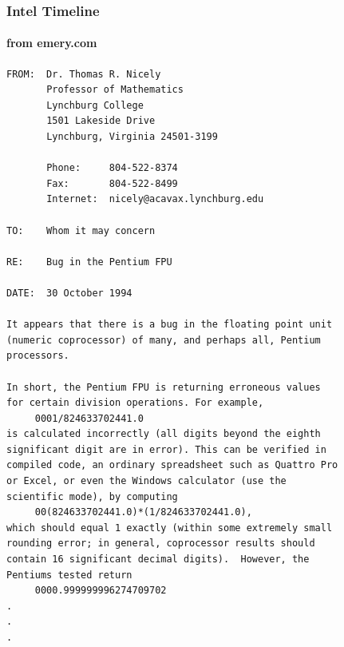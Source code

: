 \documentclass[10pt]{beamer}
\begin{document}
\begin{frame}
\frametitle{Intel Timeline}
\framesubtitle{from emery.com}
\begin{center}
    
\begin{block}{}
\begin{verbatim}
FROM:  Dr. Thomas R. Nicely
       Professor of Mathematics
       Lynchburg College
       1501 Lakeside Drive
       Lynchburg, Virginia 24501-3199

       Phone:     804-522-8374
       Fax:       804-522-8499
       Internet:  nicely@acavax.lynchburg.edu

TO:    Whom it may concern

RE:    Bug in the Pentium FPU

DATE:  30 October 1994

It appears that there is a bug in the floating point unit
(numeric coprocessor) of many, and perhaps all, Pentium
processors.

In short, the Pentium FPU is returning erroneous values 
for certain division operations. For example,
     0001/824633702441.0
is calculated incorrectly (all digits beyond the eighth
significant digit are in error). This can be verified in
compiled code, an ordinary spreadsheet such as Quattro Pro
or Excel, or even the Windows calculator (use the
scientific mode), by computing
     00(824633702441.0)*(1/824633702441.0),
which should equal 1 exactly (within some extremely small
rounding error; in general, coprocessor results should 
contain 16 significant decimal digits).  However, the
Pentiums tested return
     0000.999999996274709702
.
.
.
\end{verbatim}
\end{block}
\end{center}
\end{frame}
\end{document}
